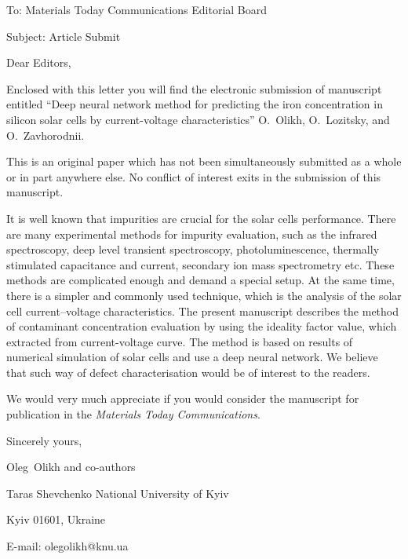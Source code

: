 \documentclass[preprint]{elsarticle}
\begin{document}
To:
Materials Today Communications  Editorial Board


Subject:
Article Submit

\vspace{5mm}
Dear Editors,

\vspace{3mm}
Enclosed with this letter you will find the electronic submission of manuscript entitled
``Deep neural network method for predicting the iron concentration in silicon solar cells by current-voltage characteristics'' O.~Olikh, O.~Lozitsky, and O.~Zavhorodnii.



This is an original paper which has not been simultaneously submitted as a whole or in part anywhere else.
No conflict of interest exits in the submission of this manuscript.


It is well known that impurities are crucial for the solar cells performance.
There are many experimental methods for impurity evaluation, such as the infrared spectroscopy, deep level transient spectroscopy, photoluminescence, thermally stimulated capacitance and current, secondary ion mass spectrometry etc.
These methods are complicated enough and demand a special setup.
At the same time, there is a simpler and commonly used technique, which
is the analysis of the solar cell current--voltage characteristics.
The present manuscript describes the method of contaminant concentration evaluation by
using the ideality factor value, which extracted from current-voltage curve.
The method is based on results of numerical simulation of solar cells and use a deep neural network.
We believe that such way of defect characterisation would be of interest to the readers.

We would  very much appreciate if you would consider the manuscript for publication in the \emph{Materials Today Communications}.

\vspace{3mm}

Sincerely yours,

Oleg~Olikh and co-authors


Taras Shevchenko National University of Kyiv


Kyiv 01601, Ukraine

E-mail: olegolikh@knu.ua


\end{document}
